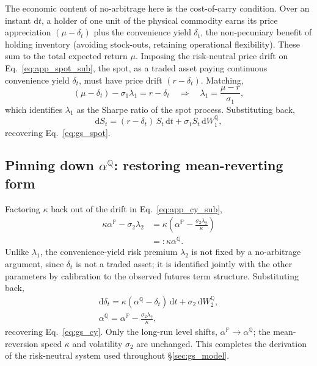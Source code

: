 \documentclass[sigconf, authorversion=true, nonacm=true]{acmart}
\newcommand{\convyield}{\delta}             %
\newcommand{\meanrev}{\kappa}               %
\newcommand{\longrun}{\alpha}               %
\begin{document}
The economic content of no-arbitrage here is the cost-of-carry condition. Over an instant $\mathrm{d}t$, a holder of one unit of the physical commodity earns its price appreciation $(\mu - \convyield_t)$ plus the convenience yield $\convyield_t$, the non-pecuniary benefit of holding inventory (avoiding stock-outs, retaining operational flexibility). These sum to the total expected return $\mu$.
\noindent
Imposing the risk-neutral price drift on Eq.~\ref{eq:app_spot_sub}, the spot, as a traded asset paying continuous convenience yield $\convyield_t$, must have price drift $(r - \convyield_t)$. Matching,
\begin{equation}
  \label{eq:app_lambda1}
  (\mu - \convyield_t) - \sigma_1\lambda_1 = r - \convyield_t
  \quad\Longrightarrow\quad
  \lambda_1 = \frac{\mu - r}{\sigma_1},
\end{equation}
\noindent
which identifies $\lambda_1$ as the Sharpe ratio of the spot process. Substituting back,
\begin{equation}
  \label{eq:app_spot_Q}
  \mathrm{d}S_t = (r - \convyield_t)\,S_t\,\mathrm{d}t + \sigma_1 S_t\,\mathrm{d}W_1^{\mathbb{Q}},
\end{equation}
\noindent
recovering Eq.~\ref{eq:gs_spot}.

\subsection{Pinning down \texorpdfstring{$\longrun^{\mathbb{Q}}$}{alphaQ}: restoring mean-reverting form}

Factoring $\meanrev$ back out of the drift in Eq.~\ref{eq:app_cy_sub},
\begin{equation}
  \label{eq:app_alphaQ}
  \begin{split}
  \meanrev\longrun^{\mathbb{P}} - \sigma_2\lambda_2
  &= \meanrev\!\left(\longrun^{\mathbb{P}} - \frac{\sigma_2\lambda_2}{\meanrev}\right) \\
  &=: \meanrev\longrun^{\mathbb{Q}}.
  \end{split}
\end{equation}
\noindent
Unlike $\lambda_1$, the convenience-yield risk premium $\lambda_2$ is not fixed by a no-arbitrage argument, since $\convyield_t$ is not a traded asset; it is identified jointly with the other parameters by calibration to the observed futures term structure. Substituting back,
\begin{equation}
  \label{eq:app_cy_Q}
  \begin{gathered}
  \mathrm{d}\convyield_t = \meanrev(\longrun^{\mathbb{Q}} - \convyield_t)\,\mathrm{d}t + \sigma_2\,\mathrm{d}W_2^{\mathbb{Q}}, \\
  \longrun^{\mathbb{Q}} = \longrun^{\mathbb{P}} - \frac{\sigma_2\lambda_2}{\meanrev},
  \end{gathered}
\end{equation}
\noindent
recovering Eq.~\ref{eq:gs_cy}. Only the long-run level shifts, $\longrun^{\mathbb{P}} \to \longrun^{\mathbb{Q}}$; the mean-reversion speed $\meanrev$ and volatility $\sigma_2$ are unchanged. This completes the derivation of the risk-neutral system used throughout \S\ref{sec:gs_model}.
\end{document}
